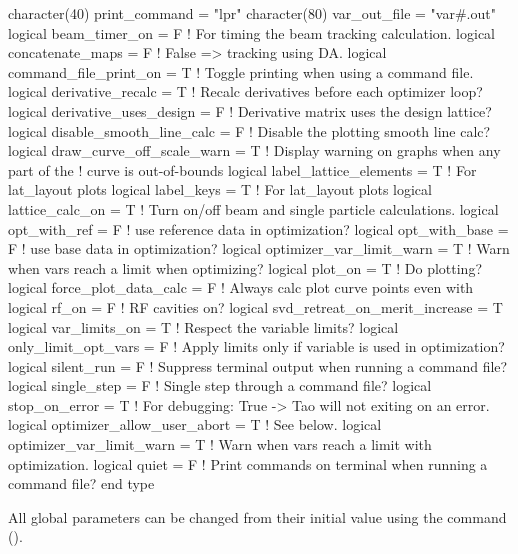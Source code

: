{{{{{{{\begin{example}
  character(40)  print_command = "lpr"
  character(80)  var_out_file  = "var#.out"
  logical beam_timer_on = F             ! For timing the beam tracking calculation.
  logical concatenate_maps = F          ! False => tracking using DA.
  logical command_file_print_on = T     ! Toggle printing when using a command file.
  logical derivative_recalc = T         ! Recalc derivatives before each optimizer loop?
  logical derivative_uses_design = F    ! Derivative matrix uses the design lattice?
  logical disable_smooth_line_calc = F  ! Disable the plotting smooth line calc?
  logical draw_curve_off_scale_warn = T ! Display warning on graphs when any part of the 
                                        !   curve is out-of-bounds
  logical label_lattice_elements = T    ! For lat_layout plots
  logical label_keys = T                ! For lat_layout plots
  logical lattice_calc_on = T           ! Turn on/off beam and single particle calculations.
  logical opt_with_ref = F              ! use reference data in optimization?
  logical opt_with_base = F             ! use base data in optimization?
  logical optimizer_var_limit_warn = T  ! Warn when vars reach a limit when optimizing?
  logical plot_on = T                   ! Do plotting?
  logical force_plot_data_calc = F      ! Always calc plot curve points even with %
  logical rf_on = F                     ! RF cavities on?
  logical svd_retreat_on_merit_increase = T    
  logical var_limits_on = T             ! Respect the variable limits?
  logical only_limit_opt_vars = F       ! Apply limits only if variable is used in optimization?
  logical silent_run = F                ! Suppress terminal output when running a command file?
  logical single_step = F               ! Single step through a command file?
  logical stop_on_error = T             ! For debugging: True -> Tao will not exiting on an error.
  logical optimizer_allow_user_abort = T ! See below.
  logical optimizer_var_limit_warn = T   ! Warn when vars reach a limit with optimization.
  logical quiet = F                      ! Print commands on terminal when running a command file?
end type
\end{example}

All global parameters can be changed from their initial value using
the  command ().

  \begin{description}
  \item{\vn{global%
This switch controls whether printing to the terminal is suppressed when a command file is called.

}}
\end{description}}}}}}}}

